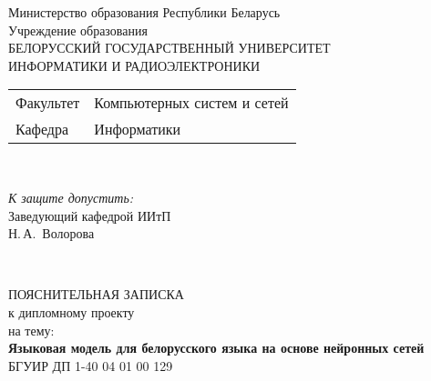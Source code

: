 \begin{titlepage}
  \begin{center}
    Министерство образования Республики Беларусь\\[1em]
    Учреждение образования\\
    БЕЛОРУССКИЙ ГОСУДАРСТВЕННЫЙ УНИВЕРСИТЕТ \\
    ИНФОРМАТИКИ И РАДИОЭЛЕКТРОНИКИ\\[1em]

    \begin{minipage}{\textwidth}
      \begin{flushleft}
        \begin{tabular}{ l l }
          Факультет & Компьютерных систем и сетей\\
          Кафедра   & Информатики
        \end{tabular}
      \end{flushleft}
    \end{minipage}\\[1em]

    \begin{flushright}
      \begin{minipage}{0.4\textwidth}
        \textit{К защите допустить:}\\[0.8em]
        Заведующий кафедрой ИИтП\\[0.45em]
        \underline{\hspace*{2.8cm}} Н.\,А.~Волорова
      \end{minipage}\\[2.2em]
    \end{flushright}

    {ПОЯСНИТЕЛЬНАЯ ЗАПИСКА}\\
    {к дипломному проекту}\\
    {на тему:}\\[1em]
    \textbf{\large Языковая модель для белорусского языка на основе нейронных сетей}\\[1em]


    {БГУИР ДП 1-40 04 01 00 129}\\[2em]
    

\end{center}
\end{titlepage}
